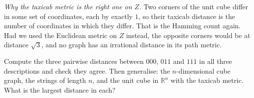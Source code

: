 \documentclass[10pt]{article}
\newcommand{\R}{\mathbb{R}}
\begin{document}
{\begin{minipage}[t]{744pt}
\begin{minipage}[t]{358pt}
\begin{why}
\emph{Why the taxicab metric is the right one on $Z$.} Two corners of the unit cube differ in some set of coordinates, each by exactly $1$, so their taxicab distance is the number of coordinates in which they differ. That is the Hamming count again. Had we used the Euclidean metric on $Z$ instead, the opposite corners would be at distance $\sqrt3$, and no graph has an irrational distance in its path metric.
\end{why}
\begin{tryit}
Compute the three pairwise distances between $000$, $011$ and $111$ in all three descriptions and check they agree. Then generalise: the $n$-dimensional cube graph, the strings of length $n$, and the unit cube in $\R^n$ with the taxicab metric. What is the largest distance in each?
\end{tryit}
\end{minipage}
\end{minipage}
}
\end{document}
